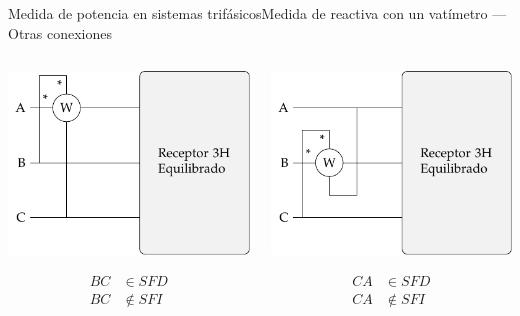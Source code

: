 \documentclass[aspectratio=169, xcolor={usenames,svgnames,dvipsnames}]{beamer}
\begin{document}
\begin{frame}{Medida de potencia en sistemas trifásicos}{Medida de reactiva con un vatímetro --- Otras conexiones}
\begin{columns}
\begin{column}{0.33\columnwidth}
\begin{center}
\includegraphics[height=0.25\textheight]{../figs/Reactiva3H_A-BC.pdf}
\end{center}
\begin{align*}
  BC &\in SFD\\
  BC &\notin SFI
\end{align*}
\end{column}
\begin{column}{0.33\columnwidth}
\begin{center}
\includegraphics[height=0.25\textheight]{../figs/Reactiva3H_B-CA.pdf}
\end{center}
\begin{align*}
  CA &\in SFD\\
  CA &\notin SFI
\end{align*}

\end{column}
\end{columns}
\end{frame}
\end{document}
